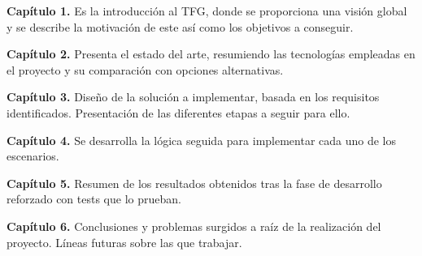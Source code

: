   \textbf{Capítulo 1.} Es la introducción al TFG, donde se proporciona una visión global y se describe la motivación de este así como los objetivos a conseguir.

  \textbf{Capítulo 2.} Presenta el estado del arte, resumiendo las tecnologías empleadas en el proyecto y su comparación con opciones alternativas.

  \textbf{Capítulo 3.} Diseño de la solución a implementar, basada en los requisitos identificados. Presentación de las  diferentes etapas a seguir para ello.

  \textbf{Capítulo 4.} Se desarrolla la lógica seguida para implementar cada uno de los escenarios.

  \textbf{Capítulo 5.} Resumen de los resultados obtenidos tras la fase de desarrollo reforzado con tests que lo prueban.

  \textbf{Capítulo 6.} Conclusiones y problemas surgidos a raíz de la realización del proyecto. Líneas futuras sobre las que trabajar.
